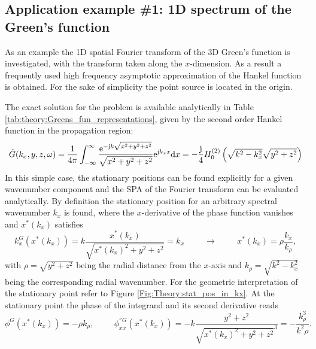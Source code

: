 \subsection*{Application example \#1: 1D spectrum of the Green's function}
\label{sec:greens_function_spectrum}

As an example the 1D spatial Fourier transform of the 3D Green's function is investigated, with the transform taken along the $x$-dimension.
As a result a frequently used high frequency asymptotic approximation of the Hankel function is obtained.
For the sake of simplicity the point source is located in the origin.

The exact solution for the problem is available analytically in Table \eqref{tab:theory:Greens_fun_representations}, given by the second order Hankel function in the propagation region:
\begin{equation}
\tilde{G}(k_x,y,z,\omega) = \frac{1}{4\pi} \int_{-\infty}^{\infty} \frac{\mathrm{e}^{-\mathrm{j} k \sqrt{x^2 + y^2 + z^2}}}{\sqrt{x^2 + y^2 + z^2}} \mathrm{e}^{\mathrm{j} k_x x} \mathrm{d} x = 
-\frac{\mathrm{j}}{4} H_0^{(2)}\left( \sqrt{k^2- k_x^2} \sqrt{y^2 + z^2} \right)
\label{Eq:HF_approx:Greens_spectrum_defintion}
\end{equation}
In this simple case, the stationary positions can be found explicitly for a given wavenumber  component and the SPA of the Fourier transform can be evaluated analytically. 
By definition the stationary position for an arbitrary spectral wavenumber $k_x$ is found, where the $x$-derivative of the phase function vanishes and $x^*(k_x)$ satisfies
\begin{equation}
k^G_x(x^*(k_x)) = 
k \frac{x^*(k_x)}{\sqrt{x^*(k_x)^2 + y^2 + z^2}} = k_x 
\hspace{1cm} \rightarrow \hspace{1cm} 
x^*(k_x) = \rho \frac{k_x}{k_{\rho}},
\label{eq:HF_approx:greens_spectrum_stat_point}
\end{equation}
with $\rho = \sqrt{y^2+z^2}$ being the radial distance from the $x$-axis and $k_{\rho} = \sqrt	{k^2-k_x^2}$ being the corresponding radial wavenumber.
For the geometric interpretation of the stationary point refer to Figure \ref{Fig:Theory:stat_pos_in_kx}.
At the stationary point the phase of the integrand and its second derivative reads
\begin{equation}
\phi^{G}(x^*(k_x)) = - \rho k_{\rho}, \hspace{1cm}
\phi^{''G}_{xx}(x^*(k_x)) =  -k \frac{y^2+z^2}{\sqrt{ x^*(k_x)^2 +y^2+z^2 }^3} = - \frac{k_{\rho}^3}{k^2 \rho}.
\end{equation}
